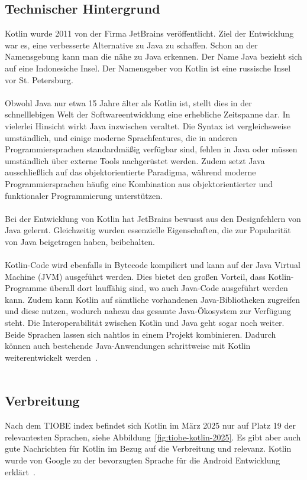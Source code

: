 \documentclass[11pt]{article}
\begin{document}
    \subsection{Technischer Hintergrund}
    Kotlin wurde 2011 von der Firma JetBrains veröffentlicht.
    Ziel der Entwicklung war es, eine verbesserte Alternative zu Java zu schaffen.
    Schon an der Namensgebung kann man die nähe zu Java erkennen.
    Der Name Java bezieht sich auf eine Indonesiche Insel.
    Der Namensgeber von Kotlin ist eine russische Insel vor St. Petersburg.\\
    \\
    Obwohl Java nur etwa 15 Jahre älter als Kotlin ist, stellt dies in der schnelllebigen Welt der Softwareentwicklung eine erhebliche Zeitspanne dar.
    In vielerlei Hinsicht wirkt Java inzwischen veraltet.
    Die Syntax ist vergleichsweise umständlich, und einige moderne Sprachfeatures, die in anderen Programmiersprachen standardmäßig verfügbar sind, fehlen in Java oder
    müssen umständlich über externe Tools nachgerüstet werden.
    Zudem setzt Java ausschließlich auf das objektorientierte Paradigma,
    während moderne Programmiersprachen häufig eine Kombination aus objektorientierter und funktionaler Programmierung unterstützen.\\
    \\
    Bei der Entwicklung von Kotlin hat JetBrains bewusst aus den Designfehlern von Java gelernt.
    Gleichzeitig wurden essenzielle Eigenschaften, die zur Popularität von Java beigetragen haben, beibehalten.\\
    \\
    Kotlin-Code wird ebenfalls in Bytecode kompiliert und kann auf der Java Virtual Machine (JVM) ausgeführt werden.
    Dies bietet den großen Vorteil, dass Kotlin-Programme überall dort lauffähig sind, wo auch Java-Code ausgeführt werden kann.
    Zudem kann Kotlin auf sämtliche vorhandenen Java-Bibliotheken zugreifen und diese nutzen, wodurch nahezu das gesamte Java-Ökosystem zur Verfügung steht.
    Die Interoperabilität zwischen Kotlin und Java geht sogar noch weiter.
    Beide Sprachen lassen sich nahtlos in einem Projekt kombinieren.
    Dadurch können auch bestehende Java-Anwendungen schrittweise mit Kotlin weiterentwickelt werden~\cite[19-20]{kotlin-handbuch}.\\
    \\
    \subsection{Verbreitung}
    Nach dem TIOBE index befindet sich Kotlin im März 2025 nur auf Platz 19 der relevantesten Sprachen, siehe Abbildung~\ref{fig:tiobe-kotlin-2025}.
    Es gibt aber auch gute Nachrichten für Kotlin im Bezug auf die Verbreitung und relevanz.
    Kotlin wurde von Google zu der bevorzugten Sprache für die Android Entwicklung erklärt~\cite{tn3-google}.\\
    \\
\end{document}
